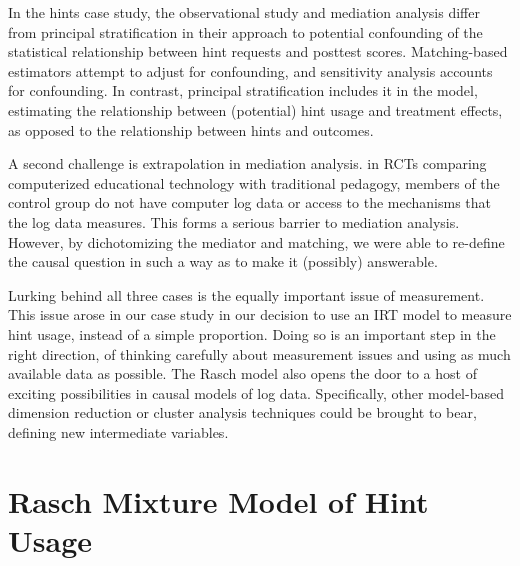 \documentclass{article}\usepackage[]{graphicx}\usepackage[]{color}
\begin{document}
In the hints case study, the observational study and mediation
analysis differ from principal stratification in their approach to
potential confounding of the statistical relationship between hint
requests and posttest scores.
Matching-based estimators attempt to adjust for confounding,
and sensitivity analysis accounts for confounding.
In contrast, principal stratification includes it in the model,
estimating the relationship between (potential) hint usage and
treatment effects, as opposed to the relationship between hints and
outcomes.

A second challenge is extrapolation in mediation analysis.
in RCTs comparing computerized educational technology with traditional
pedagogy, members of the control group do not have computer log data
or access to the mechanisms that the log data measures.
This forms a serious barrier to mediation analysis.
However, by dichotomizing the mediator and matching, we were able to
re-define the causal question in such a way as to make it (possibly) answerable.

Lurking behind all three cases is the equally important issue of
measurement.
This issue arose in our case study in our decision to use an IRT model
to measure hint usage, instead of a simple proportion.
Doing so is an important step in the right direction, of thinking
carefully about measurement issues and using as much available data as
possible.
The Rasch model also opens the door to a host of exciting
possibilities in causal models of log data.
Specifically, other model-based dimension reduction or cluster analysis techniques
could be brought to bear, defining new intermediate variables.







\newpage
\appendix

\section{Rasch Mixture Model of Hint Usage}
\end{document}
